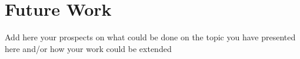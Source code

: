 \section{Future Work}
\label{sec:future_work}
Add here your prospects on what could be done on the topic you have presented here and/or how your work could be extended
